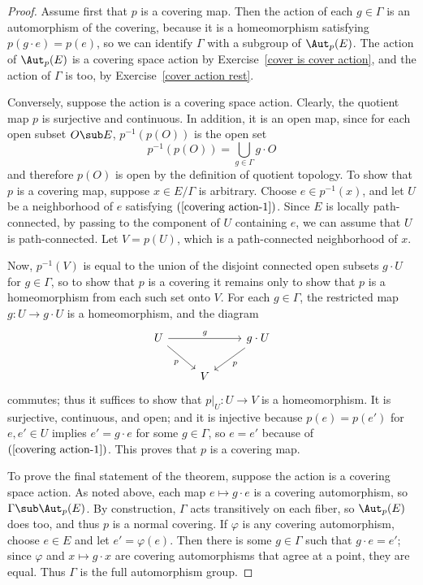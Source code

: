 \begin{proof}
Assume first that $p$ is a covering map. Then the action of each $g\in\Gamma$ is an automorphism of the covering, because it is a homeomorphism satisfying $p(g\cdot e)=p(e)$, so we can identify $\Gamma$ with a subgroup of $\Aut_p(E)$. The action of $\Aut_p(E)$ is a covering space action by Exercise~\ref{cover is cover action}, and the action of $\Gamma$ is too, by Exercise~\ref{cover action rest}.\par
Conversely, suppose the action is a covering space action. Clearly, the quotient 
map $p$ is surjective and continuous. In addition, it is an open map, since for 
each open subset $O\sub E$, $p^{-1}(p(O))$ is the open set
\[p^{-1}(p(O))=\bigcup_{g\in\Gamma}g\cdot O\]
and therefore $p(O)$ is open by the definition of quotient topology. To show that $p$ is a covering map, suppose $x\in E/\Gamma$ is arbitrary. Choose $e\in p^{-1}(x)$, and let $U$ be a neighborhood of $e$ satisfying $(\ref{covering action-1})$. Since $E$ is locally path-connected, by passing to the component of $U$ containing $e$, we can assume that $U$ is path-connected. Let $V=p(U)$, which is a path-connected neighborhood of $x$.\par
Now, $p^{-1}(V)$ is equal to the union of the disjoint connected open subsets $g\cdot U$ for $g\in\Gamma$, so to show that $p$ is a covering it remains only to show that $p$ is a homeomorphism from each such set onto $V$. For each $g\in\Gamma$, the restricted map $g:U\to g\cdot U$ is a homeomorphism, and the diagram
\[\begin{tikzcd}
U\ar[rr,"g"]\ar[rd,swap,"p"]&&g\cdot U\ar[ld,"p"]\\
&V&
\end{tikzcd}\]
commutes; thus it suffices to show that $p|_U:U\to V$ is a homeomorphism. It is surjective, continuous, and open; and it is injective because $p(e)=p(e')$ for $e,e'\in U$ implies $e'=g\cdot e$ for some $g\in\Gamma$, so $e=e'$ because of $(\ref{covering action-1})$. This proves that $p$ is a covering map.\par
To prove the final statement of the theorem, suppose the action is a covering space action. As noted above, each map $e\mapsto g\cdot e$ is a covering automorphism, so $\Gamma\sub\Aut_p(E)$. By construction, $\Gamma$ acts transitively on each fiber, so $\Aut_p(E)$ does too, and thus $p$ is a normal covering. If $\varphi$ is any covering automorphism, choose $e\in E$ and let $e'=\varphi(e)$. Then there is some $g\in\Gamma$ such that $g\cdot e=e'$; since $\varphi$ and $x\mapsto g\cdot x$ are covering automorphisms that agree at a point, they are equal. Thus $\Gamma$ is the full automorphism group.
\end{proof}
